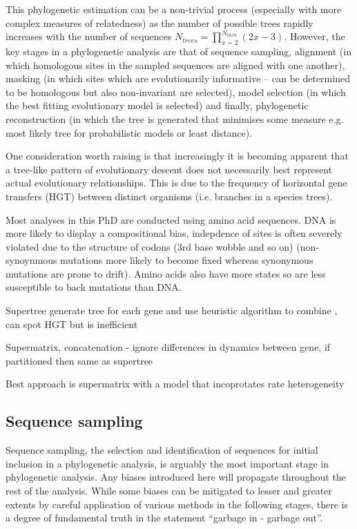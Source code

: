 This phylogenetic estimation can be a non-trivial process (especially with more complex
measures of relatedness) as the number of
possible trees rapidly increases with the number of sequences \(N_{trees} = \prod_{x=2}^{N_{taxa}} (2x - 3)\).
However, the key stages in a phylogenetic analysis are that of sequence sampling,
 alignment (in which homologous sites in the sampled sequences are aligned with one another),
 masking (in which sites which are evolutionarily informative – can be determined to be homologous 
     but also non-invariant are selected), model selection (in which the best fitting
 evolutionary model is selected) and finally, phylogenetic reconstruction (in which the tree
 is generated that minimises some measure e.g. most likely tree for probabilistic models or 
 least distance).



One consideration worth raising is that increasingly it is becoming apparent
 that a tree-like pattern of evolutionary descent does not necessarily best represent
 actual evolutionary relationships.  This is due to the frequency of horizontal gene transfers (HGT)
 between distinct organisms (i.e. branches in a species trees).


Most analyses in this PhD are conducted using amino acid sequences.  
DNA is more likely to display a compositional bias, indepdence of sites
is often severely violated due to the structure of codons (3rd base wobble and so on)
(non-synoynmous mutations more likely to become fixed whereas synonymous mutations are
prone to drift).  Amino acids also have more states so are less susceptible to back mutations
than DNA.  





Supertree generate tree for each gene and use heuristic algorithm to combine \citep{Bininda-Emonds2004}, can spot HGT but is inefficient

Supermatrix, concatenation \citep{DeQueiroz2007a} - ignore differences in dynamics between gene, if partitioned then same as supertree



Best approach is supermatrix with a model that incoprotates rate heterogeneity \citep{Ren2009}



\subsection{Sequence sampling}
Sequence sampling, the selection and identification of sequences for initial inclusion in a 
phylogenetic analysis, is arguably the most important stage in phylogenetic analysis.
Any biases introduced here will propagate throughout the rest of the analysis. 
While some biases can be mitigated to lesser and greater extents 
by careful application of various methods in the following
stages, there is a degree of fundamental truth in the statement ``garbage in - garbage out''.




